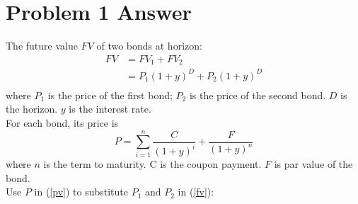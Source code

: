 \documentclass{article}
\begin{document}
    \section*{Problem 1 Answer}
    The future value $FV$ of two bonds at horizon:
    \begin{equation}
        \begin{aligned}
            FV &= FV_{1} + FV_{2}\\
            &=P_{1}(1+y)^{D} + P_{2}(1+y)^{D} \\
        \end{aligned}
        \label{fv}
    \end{equation}
    where $P_{1}$ is the price of the first bond; $P_{2}$ is the price of the second bond. $D$ is the horizon. $y$ is the interest rate.\\
    For each bond, its price is
    \begin{equation}
        \label{pv}
        P = \sum_{i=1}^{n} \frac{C}{(1+y)^i} + \frac{F}{(1+y)^{n}}
    \end{equation}
    where $n$ is the term to maturity. C is the coupon payment. $F$ is par value of the bond.\\
    Use $P$ in (\ref{pv}) to substitute $P_{1}$ and $P_{2}$ in (\ref{fv}):
\end{document}
